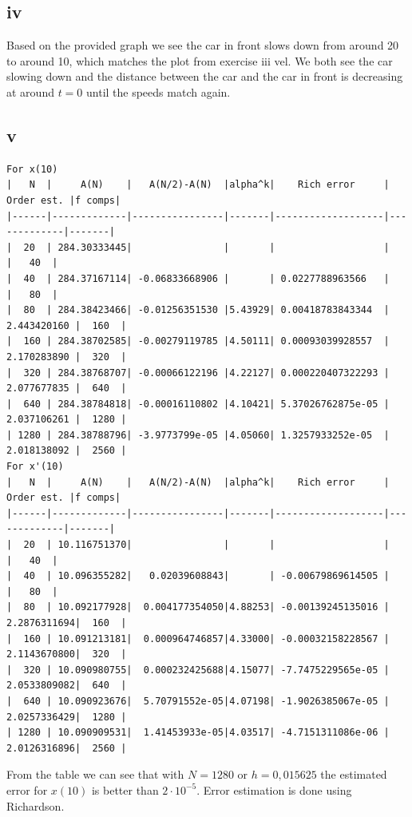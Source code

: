 \documentclass{article}
\begin{document}
\subsection*{iv}
Based on the provided graph we see the car in front slows down from around 20 to around 10, which matches the plot from exercise iii vel. 
We both see the car slowing down and the distance between the car and the car in front is decreasing at around $t=0$ until the speeds match again.

\subsection*{v}
\begin{verbatim}
For x(10)
|   N  |     A(N)    |   A(N/2)-A(N)  |alpha^k|    Rich error     |  Order est. |f comps|
|------|-------------|----------------|-------|-------------------|-------------|-------|
|  20  | 284.30333445|                |       |                   |             |   40  |
|  40  | 284.37167114| -0.06833668906 |       | 0.0227788963566   |             |   80  |
|  80  | 284.38423466| -0.01256351530 |5.43929| 0.00418783843344  | 2.443420160 |  160  |
|  160 | 284.38702585| -0.00279119785 |4.50111| 0.00093039928557  | 2.170283890 |  320  |
|  320 | 284.38768707| -0.00066122196 |4.22127| 0.000220407322293 | 2.077677835 |  640  |
|  640 | 284.38784818| -0.00016110802 |4.10421| 5.37026762875e-05 | 2.037106261 |  1280 |
| 1280 | 284.38788796| -3.9773799e-05 |4.05060| 1.3257933252e-05  | 2.018138092 |  2560 |
For x'(10)
|   N  |     A(N)    |   A(N/2)-A(N)  |alpha^k|    Rich error     |  Order est. |f comps|
|------|-------------|----------------|-------|-------------------|-------------|-------|
|  20  | 10.116751370|                |       |                   |             |   40  |
|  40  | 10.096355282|   0.02039608843|       | -0.00679869614505 |             |   80  |
|  80  | 10.092177928|  0.004177354050|4.88253| -0.00139245135016 | 2.2876311694|  160  |
|  160 | 10.091213181|  0.000964746857|4.33000| -0.00032158228567 | 2.1143670800|  320  |
|  320 | 10.090980755|  0.000232425688|4.15077| -7.7475229565e-05 | 2.0533809082|  640  |
|  640 | 10.090923676|  5.70791552e-05|4.07198| -1.9026385067e-05 | 2.0257336429|  1280 |
| 1280 | 10.090909531|  1.41453933e-05|4.03517| -4.7151311086e-06 | 2.0126316896|  2560 |
\end{verbatim}

From the table we can see that with $N=1280$ or $h=0,015625$ the estimated error for $x(10)$ is better than $2\cdot 10^{-5}$.
Error estimation is done using Richardson.
\end{document}

